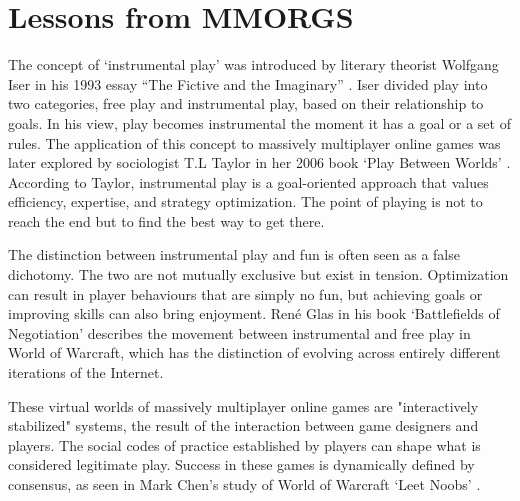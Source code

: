 \section{Lessons from MMORGS}
The concept of `instrumental play' was introduced by literary theorist Wolfgang Iser in his 1993 essay ``The Fictive and the Imaginary'' \cite{iser1993fictive}. Iser divided play into two categories, free play and instrumental play, based on their relationship to goals. In his view, play becomes instrumental the moment it has a goal or a set of rules. The application of this concept to massively multiplayer online games was later explored by sociologist T.L Taylor in her 2006 book `Play Between Worlds' \cite{taylor2009play}. According to Taylor, instrumental play is a goal-oriented approach that values efficiency, expertise, and strategy optimization. The point of playing is not to reach the end but to find the best way to get there.\par
The distinction between instrumental play and fun is often seen as a false dichotomy. The two are not mutually exclusive but exist in tension. Optimization can result in player behaviours that are simply no fun, but achieving goals or improving skills can also bring enjoyment. René Glas in his book `Battlefields of Negotiation' \cite{glas2013battlefields} describes the movement between instrumental and free play in World of Warcraft, which has the distinction of evolving across entirely different iterations of the Internet.\par
These virtual worlds of massively multiplayer online games are "interactively stabilized" systems, the result of the interaction between game designers and players. The social codes of practice established by players can shape what is considered legitimate play. Success in these games is dynamically defined by consensus, as seen in Mark Chen's study of World of Warcraft `Leet Noobs' \cite{chen2011leet}.\par
